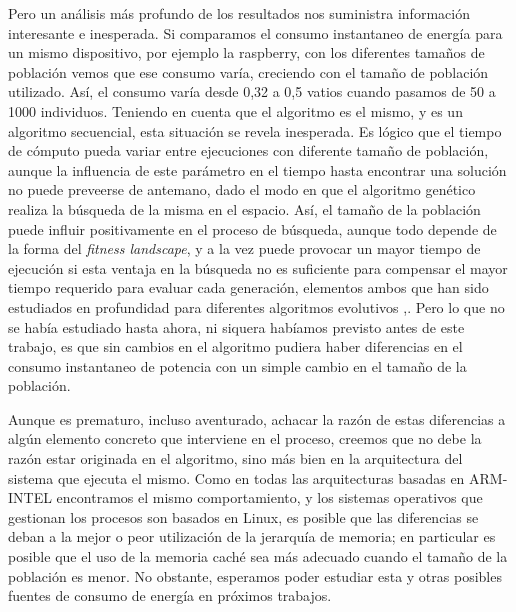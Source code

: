 Pero un análisis más profundo de los resultados nos suministra información interesante e inesperada.  Si comparamos el consumo instantaneo de energía para un mismo 
dispositivo, por ejemplo la raspberry, con los diferentes tamaños de población vemos que ese consumo varía, creciendo con el tamaño de población utilizado.  Así, el consumo 
varía desde 0,32 a 0,5 vatios cuando pasamos de 50 a 1000 individuos.  Teniendo en cuenta que el algoritmo es el mismo, y es un algoritmo secuencial, esta situación se 
revela inesperada. Es lógico que el tiempo de cómputo pueda variar entre ejecuciones con diferente tamaño de población, aunque la influencia de este parámetro en el tiempo 
hasta encontrar una solución no puede preveerse de antemano, dado el modo en que el algoritmo genético realiza la búsqueda de la misma en el espacio.  Así, el tamaño de la 
población puede influir positivamente en el proceso de búsqueda, aunque todo depende de la forma del \textit{fitness landscape}, y a la vez puede provocar un mayor tiempo 
de ejecución si esta ventaja en la búsqueda no es suficiente para compensar el mayor tiempo requerido para evaluar cada generación, elementos ambos que han sido estudiados 
en profundidad para diferentes algoritmos evolutivos \cite{cantupaz},\cite{fcofdez}.  Pero lo que no se había estudiado hasta ahora, ni siquera habíamos previsto antes de 
este trabajo, es que sin cambios en el algoritmo pudiera haber diferencias en el consumo instantaneo de potencia con un simple cambio en el tamaño de la población.

Aunque es prematuro, incluso aventurado, achacar la razón de estas diferencias a algún elemento concreto que interviene en el proceso, creemos que no debe la razón estar 
originada en el algoritmo, sino más bien en la arquitectura del sistema que ejecuta el mismo.  Como en todas las arquitecturas basadas en ARM-INTEL encontramos el mismo 
comportamiento, y los sistemas operativos que gestionan los procesos son basados en Linux, es posible que las diferencias se deban a la mejor o peor utilización de la 
jerarquía de memoria;  en particular es posible que el uso de la memoria caché sea más adecuado cuando el tamaño de la población es menor.  No obstante, esperamos poder 
estudiar esta y otras posibles fuentes de consumo de energía en próximos trabajos.
